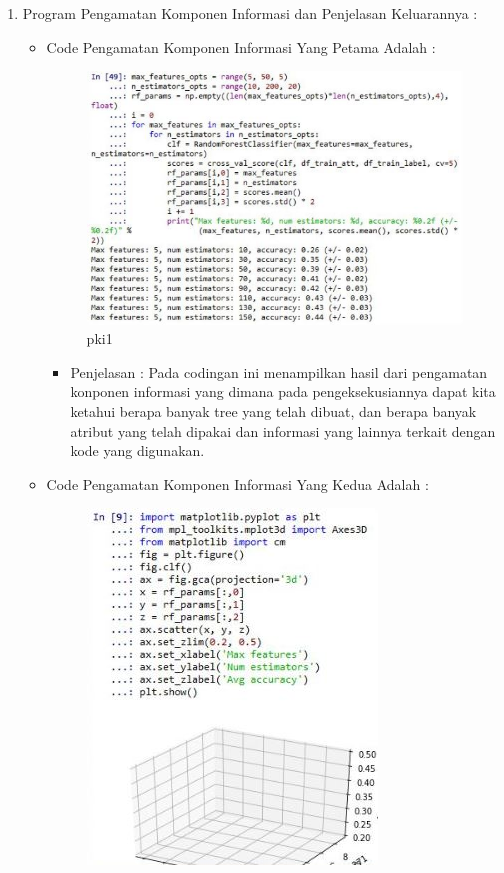 \begin{enumerate}
\par
\par
\item Program Pengamatan Komponen Informasi dan Penjelasan Keluarannya :
\begin{itemize}
\item Code Pengamatan Komponen Informasi Yang Petama Adalah :
\par
\begin{figure}[ht]
\centering
\includegraphics[scale=0.2]{figures/pki1.jpg}
\caption{pki1}
\label{contoh}
\end{figure}
\par
\begin{itemize}
\item Penjelasan : Pada codingan ini menampilkan hasil dari pengamatan konponen informasi yang dimana pada pengeksekusiannya dapat kita ketahui berapa banyak tree yang telah dibuat, dan berapa banyak atribut yang telah dipakai dan informasi yang lainnya terkait dengan kode yang digunakan.
\par 
\par
\end{itemize}
\item Code Pengamatan Komponen Informasi Yang Kedua Adalah :
\par
\begin{figure}[ht]
\centering
\includegraphics[scale=0.2]{figures/pki2.jpg}

\end{figure}
\end{itemize}
\end{enumerate}
